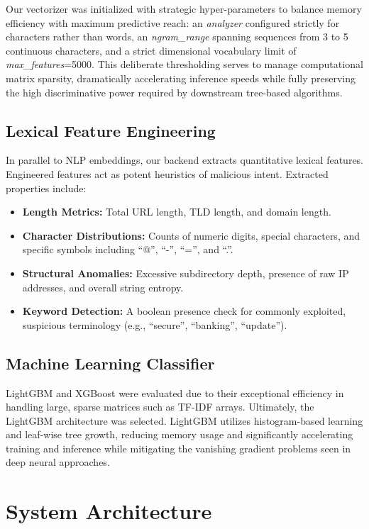 \documentclass[conference]{IEEEtran}
\begin{document}
Our vectorizer was initialized with strategic hyper-parameters to balance memory efficiency with maximum predictive reach: an \textit{analyzer} configured strictly for characters rather than words, an \textit{ngram\_range} spanning sequences from 3 to 5 continuous characters, and a strict dimensional vocabulary limit of \textit{max\_features}=5000. This deliberate thresholding serves to manage computational matrix sparsity, dramatically accelerating inference speeds while fully preserving the high discriminative power required by downstream tree-based algorithms.

\subsection{Lexical Feature Engineering}
In parallel to NLP embeddings, our backend extracts quantitative lexical features. Engineered features act as potent heuristics of malicious intent. Extracted properties include:
\begin{itemize}
    \item \textbf{Length Metrics:} Total URL length, TLD length, and domain length. 
    \item \textbf{Character Distributions:} Counts of numeric digits, special characters, and specific symbols including ``@'', ``-'', ``='', and ``.''.
    \item \textbf{Structural Anomalies:} Excessive subdirectory depth, presence of raw IP addresses, and overall string entropy.
    \item \textbf{Keyword Detection:} A boolean presence check for commonly exploited, suspicious terminology (e.g., ``secure'', ``banking'', ``update'').
\end{itemize}

\subsection{Machine Learning Classifier}
LightGBM and XGBoost were evaluated due to their exceptional efficiency in handling large, sparse matrices such as TF-IDF arrays. Ultimately, the LightGBM architecture was selected. LightGBM utilizes histogram-based learning and leaf-wise tree growth, reducing memory usage and significantly accelerating training and inference while mitigating the vanishing gradient problems seen in deep neural approaches.

\section{System Architecture}
\end{document}
